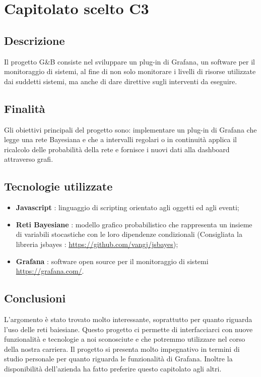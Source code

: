 \section{Capitolato scelto C3}
	\subsection{Descrizione}
		Il progetto G\&B consiste nel sviluppare un plug-in di Grafana, un software per il monitoraggio di sistemi, al fine di non solo monitorare i livelli di risorse utilizzate dai suddetti sistemi, ma anche di dare direttive sugli interventi da eseguire.
	\subsection{Finalità}
		Gli obiettivi principali del progetto sono: implementare un plug-in di Grafana che legge una rete Bayesiana e che a intervalli regolari o in continuità applica il ricalcolo delle probabilità della rete e fornisce i nuovi dati alla dashboard attraverso grafi.
	\subsection{Tecnologie utilizzate}
		\begin{itemize}
			\item \textbf{Javascript} : linguaggio di scripting orientato agli oggetti ed agli eventi;
			\item \textbf{Reti Bayesiane} : modello grafico probabilistico che rappresenta un insieme di variabili stocastiche con le loro dipendenze condizionali (Consigliata la libreria jsbayes : \url{https://github.com/vangj/jsbayes});
			\item \textbf{Grafana} : software open source per il monitoraggio di sistemi \url{https://grafana.com/}.
		\end{itemize}
	\subsection{Conclusioni}
		L'argomento è stato trovato molto interessante, soprattutto per quanto riguarda l'uso delle reti baiesiane. Questo progetto ci permette di interfacciarci con nuove funzionalità e tecnologie a noi sconosciute e che potremmo utilizzare nel corso della nostra carriera.
		Il progetto si presenta molto impegnativo in termini di studio personale per quanto riguarda le funzionalità di Grafana.
		Inoltre la disponibilità dell'azienda ha fatto preferire questo capitolato agli altri.